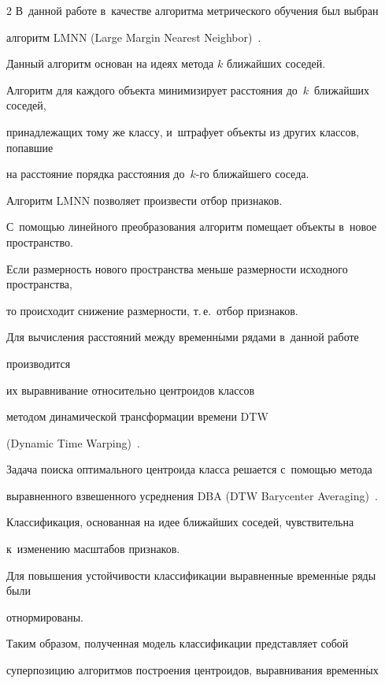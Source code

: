\begin{multicols}{2}
В~данной работе в~качестве алгоритма метрического обучения был выбран 


алгоритм LMNN (Large Margin Nearest Neighbor)~\cite{weinberger2005lmnn}.


Данный алгоритм основан на идеях метода $k$ ближайших соседей.


Алгоритм для каж\-до\-го объекта минимизирует расстояния до~$k$~ближайших соседей, 


принадлежащих тому же классу, и~штрафует объекты из других классов, попавшие 


на расстояние порядка расстояния до~$k$-го ближайшего соседа.





Алгоритм LMNN позволяет произвести отбор признаков.


С~помощью линейного преобразования алгоритм помещает объекты в~новое пространство.


Если размерность нового пространства меньше размерности исходного пространства, 


то происходит снижение размерности, т.\,е.\ отбор признаков.





Для вычисления расстояний между временн$\acute{\mbox{ы}}$ми рядами в~данной работе 


производится 


их выравнивание относительно центроидов классов 


методом динамической трансформации времени DTW 


(Dynamic Time Warping)~\cite{berndt1994dtw}.


Задача поиска оптимального центроида класса решается с~помощью метода 


выравненного взвешенного усреднения DBA (DTW Barycenter Averaging)~\cite{petitjean2011dba}.


Классификация, основанная на идее ближайших соседей, чувствительна 


к~изменению масштабов признаков.


Для повышения устойчивости классификации выравненные временн$\acute{\mbox{ы}}$е ряды были 


отнормированы.





Таким образом, полученная модель классификации представляет собой 


суперпозицию алгоритмов построения центроидов, выравнивания временн$\acute{\mbox{ы}}$х 



\end{multicols}
